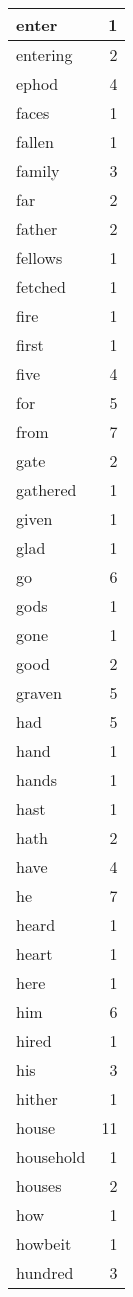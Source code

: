 \begin{center}
\begin{longtable}{l|r}
enter & 1\\ \hline 
entering & 2\\ \hline 
ephod & 4\\ \hline 
faces & 1\\ \hline 
fallen & 1\\ \hline 
family & 3\\ \hline 
far & 2\\ \hline 
father & 2\\ \hline 
fellows & 1\\ \hline 
fetched & 1\\ \hline 
fire & 1\\ \hline 
first & 1\\ \hline 
five & 4\\ \hline 
for & 5\\ \hline 
from & 7\\ \hline 
gate & 2\\ \hline 
gathered & 1\\ \hline 
given & 1\\ \hline 
glad & 1\\ \hline 
go & 6\\ \hline 
gods & 1\\ \hline 
gone & 1\\ \hline 
good & 2\\ \hline 
graven & 5\\ \hline 
had & 5\\ \hline 
hand & 1\\ \hline 
hands & 1\\ \hline 
hast & 1\\ \hline 
hath & 2\\ \hline 
have & 4\\ \hline 
he & 7\\ \hline 
heard & 1\\ \hline 
heart & 1\\ \hline 
here & 1\\ \hline 
him & 6\\ \hline 
hired & 1\\ \hline 
his & 3\\ \hline 
hither & 1\\ \hline 
house & 11\\ \hline 
household & 1\\ \hline 
houses & 2\\ \hline 
how & 1\\ \hline 
howbeit & 1\\ \hline 
hundred & 3\\ \hline 

\end{longtable}
\end{center}
